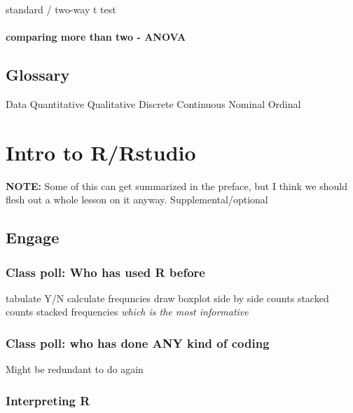 \documentclass[
]{book}
\begin{document}
standard / two-way t test

\hypertarget{comparing-more-than-two---anova}{%
\subsubsection{comparing more than two - ANOVA}\label{comparing-more-than-two---anova}}

\hypertarget{glossary-3}{%
\section*{Glossary}\label{glossary-3}}

Data
Quantitative
Qualitative
Discrete
Continuous
Nominal
Ordinal

\hypertarget{intro-to-rrstudio-1}{%
\chapter{Intro to R/Rstudio}\label{intro-to-rrstudio-1}}

\textbf{NOTE:} Some of this can get summarized in the preface, but I think we should flesh out a whole lesson on it anyway. Supplemental/optional

\hypertarget{engage-6}{%
\section{Engage}\label{engage-6}}

\hypertarget{class-poll-who-has-used-r-before}{%
\subsection{Class poll: Who has used R before}\label{class-poll-who-has-used-r-before}}

tabulate Y/N
calculate frequncies
draw boxplot
side by side counts
stacked counts
stacked frequencies
\emph{which is the most informative}

\hypertarget{class-poll-who-has-done-any-kind-of-coding}{%
\subsection{Class poll: who has done ANY kind of coding}\label{class-poll-who-has-done-any-kind-of-coding}}

Might be redundant to do again

\hypertarget{interpreting-r}{%
\subsection{Interpreting R}\label{interpreting-r}}
\end{document}
